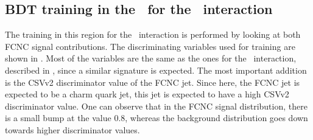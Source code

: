 \clearpage
\subsection{BDT training in the \TTSR\ for the \Zct\ interaction}
\label{sec:BDTTTSRZCT}
The training in this region for the \Zct\ interaction is performed by looking at both FCNC signal contributions. The discriminating variables used for training are shown in . Most of the variables are the same as the ones for the \Zut\ interaction, described in , since a similar signature is expected. The most important addition is the CSVv2 discriminator value of the FCNC jet. Since here, the FCNC jet is expected to be a charm quark jet, this jet is expected to have a high CSVv2 discriminator value.  One can observe that in the FCNC signal distribution, there is a small bump at the value 0.8, whereas the background distribution goes down towards higher discriminator values.

